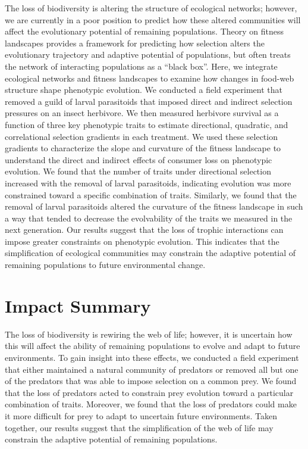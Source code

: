 \documentclass[11pt,]{article}
\begin{document}
The loss of biodiversity is altering the structure of ecological
networks; however, we are currently in a poor position to predict how
these altered communities will affect the evolutionary potential of
remaining populations. Theory on fitness landscapes provides a framework
for predicting how selection alters the evolutionary trajectory and
adaptive potential of populations, but often treats the network of
interacting populations as a ``black box''. Here, we integrate
ecological networks and fitness landscapes to examine how changes in
food-web structure shape phenotypic evolution. We conducted a field
experiment that removed a guild of larval parasitoids that imposed
direct and indirect selection pressures on an insect herbivore. We then
measured herbivore survival as a function of three key phenotypic traits
to estimate directional, quadratic, and correlational selection
gradients in each treatment. We used these selection gradients to
characterize the slope and curvature of the fitness landscape to
understand the direct and indirect effects of consumer loss on
phenotypic evolution. We found that the number of traits under
directional selection increased with the removal of larval parasitoids,
indicating evolution was more constrained toward a specific combination
of traits. Similarly, we found that the removal of larval parasitoids
altered the curvature of the fitness landscape in such a way that tended
to decrease the evolvability of the traits we measured in the next
generation. Our results suggest that the loss of trophic interactions
can impose greater constraints on phenotypic evolution. This indicates
that the simplification of ecological communities may constrain the
adaptive potential of remaining populations to future environmental
change.

\newpage

\section{Impact Summary}\label{impact-summary}

The loss of biodiversity is rewiring the web of life; however, it is
uncertain how this will affect the ability of remaining populations to
evolve and adapt to future environments. To gain insight into these
effects, we conducted a field experiment that either maintained a
natural community of predators or removed all but one of the predators
that was able to impose selection on a common prey. We found that the
loss of predators acted to constrain prey evolution toward a particular
combination of traits. Moreover, we found that the loss of predators
could make it more difficult for prey to adapt to uncertain future
environments. Taken together, our results suggest that the
simplification of the web of life may constrain the adaptive potential
of remaining populations.
\end{document}
